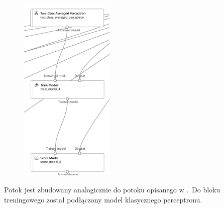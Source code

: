 \begin{figure}[H]
    \centering
    \includegraphics[width=0.4\textwidth]{images/ap_pipe}
    \label{fig:ap-pipe}
\end{figure}

Potok jest zbudowany analogicznie do potoku opisanego w .\ Do bloku treningowego został podłączony model klasycznego perceptronu.

